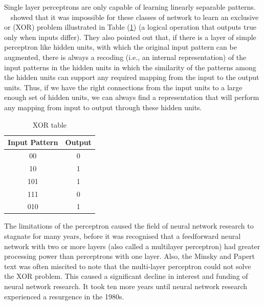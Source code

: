 \documentclass[12pt]{report}
\numberwithin{equation}{section}
\begin{document}
Single layer perceptrons are only capable of learning linearly separable patterns. \textbf{~\cite{MinskyPapert:69}} showed that it was impossible for these classes of network to learn an exclusive or (XOR) problem illustrated in Table (\ref{tab:xor}) (a logical operation that outputs true only when inputs differ). They also pointed out that, if there is a layer of simple perceptron like hidden units, with which the original input pattern can be augmented, there is always a recoding (i.e., an internal representation) of the input patterns in the hidden units in which the similarity of the patterns among the hidden units can support any required mapping from the input to the output units. Thus, if we have the right connections
from the input units to a large enough set of hidden units, we can always find a representation that will perform any mapping from input to output through these hidden units.
\begin{table}
\centering
\begin{tabular}{cc}
\hline
Input Pattern & Output \\
\hline
00 & 0 \\
10 & 1 \\
101& 1 \\
111 & 0 \\
010 & 1 \\
\hline
\end{tabular}
\caption{XOR table}
\label{tab:xor}
\end{table}

The limitations of the perceptron caused the field of neural network research to stagnate for many years, before it was recognised that a feedforward neural network with two or more layers (also called a multilayer perceptron) had greater processing power than perceptrons with one layer. Also, the Minsky and Papert text was often miscited to note that the multi-layer perceptron could not solve the XOR problem. This caused a significant decline in interest and funding of neural network research. It took ten more years until neural network research experienced a resurgence in the 1980s. 
\end{document}
